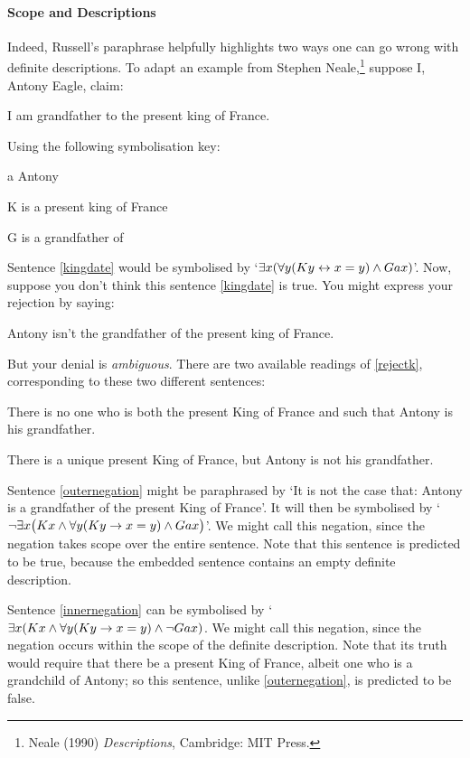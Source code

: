 \paragraph{Scope and Descriptions}
Indeed, Russell's paraphrase helpfully highlights two ways one can go wrong with definite descriptions. To adapt an example from Stephen Neale,\footnote{Neale (1990) \emph{Descriptions}, Cambridge: MIT Press.} suppose I, Antony Eagle, claim:
	\begin{earg}
		\item[\ex{kingdate}] I am grandfather to the present king of France.
	\end{earg}
Using the following symbolisation key:
	\begin{ekey}
		\item[a] Antony
		\item[K]  is a present king of France
		\item[G]  is a grandfather of 
	\end{ekey}
Sentence \ref{kingdate} would be symbolised by `$\exists x (\forall y(Ky \leftrightarrow  x = y) \wedge Gax)$'. Now, suppose you don't think this sentence \ref{kingdate} is true. You might express your rejection by saying:
\begin{earg}
	\item[\ex{rejectk}] Antony isn't the grandfather of the present king of France.
 \end{earg} But your denial is \emph{ambiguous}. There are two available readings of \ref{rejectk}, corresponding to these two different sentences:
	\begin{earg}
		\item[\ex{outernegation}] There is no one who is both the present King of France and such that Antony is his grandfather.
		\item[\ex{innernegation}] There is a unique present King of France, but Antony is not his grandfather.
	\end{earg}
Sentence \ref{outernegation} might be paraphrased by `It is not the case that: Antony is a grandfather of the present King of France'. It will then be symbolised by `$\neg \exists x\bigl(Kx \wedge \forall y(Ky \rightarrow  x = y) \wedge Gax \bigr)$'. We might call this  negation, since the negation takes scope over the entire sentence. Note that this sentence is predicted to be true, because the embedded sentence contains an empty definite description.

Sentence \ref{innernegation} can be symbolised by `$\exists x (Kx \wedge \forall y(Ky \rightarrow x = y) \wedge \neg Gax)$. We might call this  negation, since the negation occurs within the scope of the definite description. Note that its truth would require that there be a present King of France, albeit one who is a grandchild of Antony; so this sentence, unlike \ref{outernegation}, is predicted to be false.


